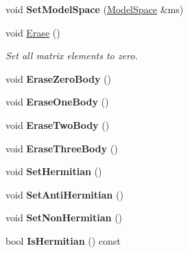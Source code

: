 \begin{DoxyCompactItemize}
\item 
\hypertarget{classOperator_ade09f5e47031f285f10d7f4f8a5e0216}{void {\bfseries Set\-Model\-Space} (\hyperlink{classModelSpace}{Model\-Space} \&ms)}\label{classOperator_ade09f5e47031f285f10d7f4f8a5e0216}

\item 
\hypertarget{classOperator_a8a0f7d6aa5163929850d06b31dc24a55}{void \hyperlink{classOperator_a8a0f7d6aa5163929850d06b31dc24a55}{Erase} ()}\label{classOperator_a8a0f7d6aa5163929850d06b31dc24a55}

\begin{DoxyCompactList}\small\item\em Set all matrix elements to zero. \end{DoxyCompactList}\item 
\hypertarget{classOperator_aee08b8c721271c700f325e02ba7b47d1}{void {\bfseries Erase\-Zero\-Body} ()}\label{classOperator_aee08b8c721271c700f325e02ba7b47d1}

\item 
\hypertarget{classOperator_ab26470d0c88d61699443223675e57bbe}{void {\bfseries Erase\-One\-Body} ()}\label{classOperator_ab26470d0c88d61699443223675e57bbe}

\item 
\hypertarget{classOperator_a5c49da3f408b79a7430af4e3ec1ff8df}{void {\bfseries Erase\-Two\-Body} ()}\label{classOperator_a5c49da3f408b79a7430af4e3ec1ff8df}

\item 
\hypertarget{classOperator_a5e26abdcd6cc57d804ee25f645d42a0c}{void {\bfseries Erase\-Three\-Body} ()}\label{classOperator_a5e26abdcd6cc57d804ee25f645d42a0c}

\item 
\hypertarget{classOperator_aacf220459ab56d57e8c585a5293c5d4f}{void {\bfseries Set\-Hermitian} ()}\label{classOperator_aacf220459ab56d57e8c585a5293c5d4f}

\item 
\hypertarget{classOperator_a11bd88adeab50ade02c514a1e72ffffb}{void {\bfseries Set\-Anti\-Hermitian} ()}\label{classOperator_a11bd88adeab50ade02c514a1e72ffffb}

\item 
\hypertarget{classOperator_a80823b246f657f9a8e26d1462492e116}{void {\bfseries Set\-Non\-Hermitian} ()}\label{classOperator_a80823b246f657f9a8e26d1462492e116}

\item 
\hypertarget{classOperator_ae6a0b023e0196f2eab07864844683a89}{bool {\bfseries Is\-Hermitian} () const }\label{classOperator_ae6a0b023e0196f2eab07864844683a89}


\end{DoxyCompactItemize}

